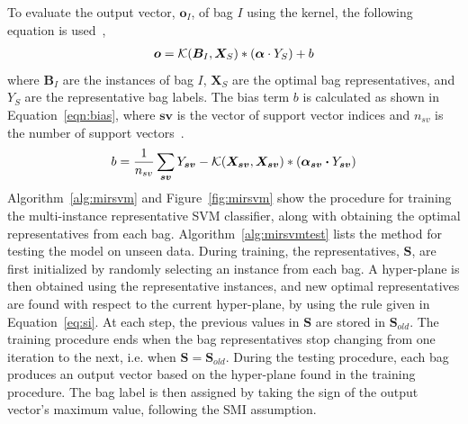 To evaluate the output vector, $\bm o_I$, of bag $I$ using the kernel, the following equation is used~\citep{Huang2006},
\begin{align}
\bm o = \mathcal{K}(\bm B_I,\bm X_S)*(\bm\alpha \cdot Y_S) + b
\end{align}
where $\bm B_I$ are the instances of bag $I$, $\bm X_S$ are the optimal bag representatives, and $Y_S$ are the representative bag labels. The bias term $b$ is calculated as shown in Equation~\ref{eqn:bias}, where $\bm{sv}$ is the vector of support vector indices and $n_{sv}$ is the number of support vectors~\citep{Huang2006}.
\begin{align}
\label{eqn:bias}
b = \frac{1}{n_{sv}}\sum_{\bm{sv}} Y_{\bm{sv}} - \mathcal{K}(\bm X_{\bm{sv}},\bm X_{\bm{sv}})*(\bm \alpha_{\bm{sv}}\bm\cdot Y_{\bm{sv}})
\end{align}
\newpage
Algorithm~\ref{alg:mirsvm} and Figure~\ref{fig:mirsvm} show the procedure for training the multi-instance representative SVM classifier, along with obtaining the optimal representatives from each bag. Algorithm~\ref{alg:mirsvmtest} lists the method for testing the model on unseen data. During training, the representatives, $\bm S$, are first initialized by randomly selecting an instance from each bag. A hyper-plane is then obtained using the representative instances, and new optimal representatives are found with respect to the current hyper-plane, by using the rule given in Equation~\eqref{eq:si}. At each step, the previous values in $\bm S$ are stored in $\bm S_{old}$. The training procedure ends when the bag representatives stop changing from one iteration to the next, i.e. when $\bm S = \bm S_{old}$. During the testing procedure, each bag produces an output vector based on the hyper-plane found in the training procedure. The bag label is then assigned by taking the sign of the output vector's maximum value, following the SMI assumption. 

